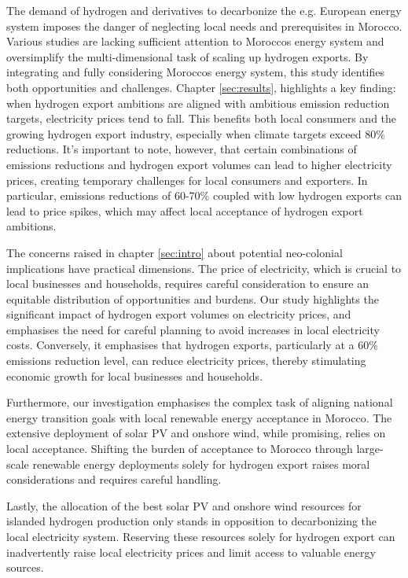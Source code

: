 The demand of hydrogen and derivatives to decarbonize the e.g. European energy system imposes the danger of neglecting local needs and prerequisites in Morocco. Various studies \cite{Wijk2021, AbouSeada2022, Zwaan2021, Schellekens2010, Touili2022, Timmerberg2019, Sens2022} are lacking sufficient attention to Moroccos energy system and oversimplify the multi-dimensional task of scaling up hydrogen exports. By integrating and fully considering Moroccos energy system, this study identifies both opportunities and challenges. Chapter \ref{sec:results}, highlights a key finding: when hydrogen export ambitions are aligned with ambitious emission reduction targets, electricity prices tend to fall. This benefits both local consumers and the growing hydrogen export industry, especially when climate targets exceed 80\% reductions. It's important to note, however, that certain combinations of emissions reductions and hydrogen export volumes can lead to higher electricity prices, creating temporary challenges for local consumers and exporters. In particular, emissions reductions of 60-70\% coupled with low hydrogen exports can lead to price spikes, which may affect local acceptance of hydrogen export ambitions.

The concerns raised in chapter \ref{sec:intro} about potential neo-colonial implications have practical dimensions. The price of electricity, which is crucial to local businesses and households, requires careful consideration to ensure an equitable distribution of opportunities and burdens. Our study highlights the significant impact of hydrogen export volumes on electricity prices, and emphasises the need for careful planning to avoid increases in local electricity costs. Conversely, it emphasises that hydrogen exports, particularly at a 60\% emissions reduction level, can reduce electricity prices, thereby stimulating economic growth for local businesses and households.

Furthermore, our investigation emphasises the complex task of aligning national energy transition goals with local renewable energy acceptance in Morocco. The extensive deployment of solar PV and onshore wind, while promising, relies on local acceptance. Shifting the burden of acceptance to Morocco through large-scale renewable energy deployments solely for hydrogen export raises moral considerations and requires careful handling.

Lastly, the allocation of the best solar PV and onshore wind resources for islanded hydrogen production only stands in opposition to decarbonizing the local electricity system. Reserving these resources solely for hydrogen export can inadvertently raise local electricity prices and limit access to valuable energy sources.

